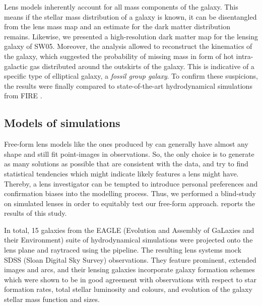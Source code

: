 Lens models inherently account for all mass components of the galaxy. This means
if the stellar mass distribution of a galaxy is known, it can be disentangled
from the lens mass map and an estimate for the dark matter
distribution remains.  Likewise, we presented a high-resolution dark matter map
for the lensing galaxy of SW05.  Moreover, the analysis allowed to reconstruct
the kinematics of the galaxy, which suggested the probability of missing mass in
form of hot intra-galactic gas distributed around the outskirts of the galaxy.
This is indicative of a specific type of elliptical galaxy, a \textit{fossil
group galaxy}.  To confirm these suspicions, the results were finally compared
to state-of-the-art hydrodynamical simulations from FIRE .

\subsection{Models of simulations}

Free-form lens models like the ones produced by  can generally have
almost any shape and still fit point-images in observations.  So, the only choice is
to generate as many solutions as possible that are consistent with the data, and
try to find statistical tendencies which might indicate likely features a lens
might have.  Thereby, a lens investigator can be tempted to introduce personal
preferences and confirmation biases into the modelling process.  Thus, we
performed a blind-study on simulated lenses in order to equitably test our
free-form approach.  reports the results of this study.  

In total, 15 galaxies from the EAGLE (Evolution and Assembly of GaLaxies and
their Environment) suite of hydrodynamical simulations were projected onto the
lens plane and raytraced using the  pipeline.  The resulting lens
systems mock SDSS (Sloan Digital Sky Survey) observations. They feature
prominent, extended images and arcs, and their lensing galaxies incorporate
galaxy formation schemes which were shown to be in good agreement with
observations with respect to star formation rates, total stellar luminosity and
colours, and evolution of the galaxy stellar mass function and sizes.

